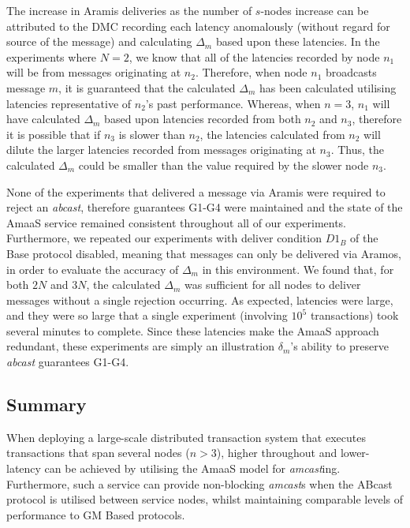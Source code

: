 	The increase in \textsf{Aramis} deliveries as the number of $s$-nodes increase can be attributed to the DMC recording each latency anomalously (without regard for source of the message) and calculating $\Delta_m$ based upon these latencies.  In the experiments where $N=2$, we know that all of the latencies recorded by node $n_1$ will be from messages originating at $n_2$.  Therefore, when node $n_1$ broadcasts message $m$, it is guaranteed that the calculated $\Delta_m$ has been calculated utilising latencies representative of $n_2$'s past performance.  Whereas, when $n=3$, $n_1$ will have calculated $\Delta_m$ based upon latencies recorded from both $n_2$ and $n_3$, therefore it is possible that if $n_3$ is slower than $n_2$, the latencies calculated from $n_2$ will dilute the larger latencies recorded from messages originating at $n_3$.  Thus, the calculated $\Delta_m$ could be smaller than the value required by the slower node $n_3$.  
	
	None of the experiments that delivered a message via \textsf{Aramis} were required to reject an \emph{abcast}, therefore guarantees G1-G4 were maintained and the state of the \textsf{AmaaS} service remained consistent throughout all of our experiments.  Furthermore, we repeated our experiments with deliver condition $D1_B$ of the \textsf{Base} protocol disabled, meaning that messages can only be delivered via \textsf{Aramos}, in order to evaluate the accuracy of $\Delta_m$ in this environment.  We found that, for both $2N$ and $3N$, the calculated $\Delta_m$ was sufficient for all nodes to deliver messages without a single rejection occurring.  As expected, latencies were large, and they were so large that a single experiment (involving $10^5$ transactions) took several minutes to complete.  Since these latencies make the \textsf{AmaaS} approach redundant, these experiments are simply an illustration $\delta_m$'s ability to preserve \emph{abcast} guarantees G1-G4.  
		
	\subsection{Summary}
	When deploying a large-scale distributed transaction system that executes transactions that span several nodes ($n > 3$), higher throughout and lower-latency can be achieved by utilising the \textsf{AmaaS} model for \emph{amcast}ing.  Furthermore, such a service can provide non-blocking \emph{amcast}s when the  \textsf{ABcast} protocol is utilised between service nodes, whilst maintaining comparable levels of performance to GM Based protocols.  

